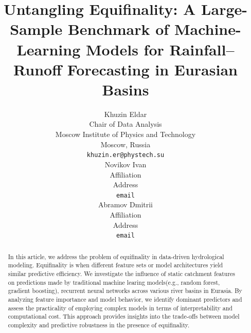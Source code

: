 \documentclass{article}
\title{Untangling Equifinality: A Large-Sample Benchmark of Machine-Learning Models for Rainfall–Runoff Forecasting in Eurasian Basins}
\author{
    Khuzin Eldar \\
    Chair of Data Analysis\\
    Moscow Institute of Physics and Technology\\
    Moscow, Russia \\
    \texttt{khuzin.er@phystech.su} \\
    \And
    Novikov Ivan \\
    Affiliation \\
    Address \\
    \texttt{email} \\
    \And
    Abramov Dmitrii \\
    Affiliation \\
    Address \\
    \texttt{email}
}
\date{}
\begin{document}
\sloppy
\justifying

\maketitle


\begin{abstract}
    In this article, we address the problem of equifinality in data-driven hydrological modeling. Equifinality is when different feature sets or model architectures yield similar predictive efficiency. We investigate the influence of static catchment features on predictions made by traditional machine learing models(e.g., random forest, gradient boosting), recurrent neural networks across various river basins in Eurasia. By analyzing feature importance and model behavior, we identify dominant predictors and assess the practicality of employing complex models in terms of interpretability and computational cost. This approach provides insights into the trade-offs between model complexity and predictive robustness in the presence of equifinality.
\end{abstract}










\end{document}
